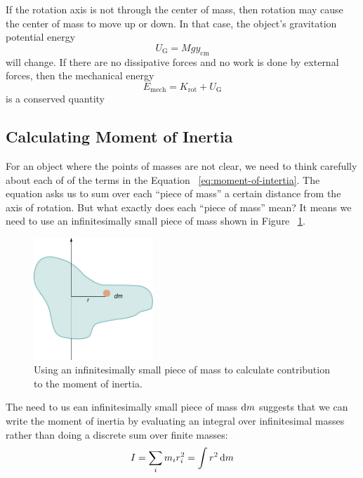 If the rotation axis is not through the center of mass, then rotation
may cause the center of mass to move up or down.  In that case, the
object's gravitation potential energy
\begin{equation}
    U_\mathrm{G} = Mgy_\mathrm{cm}
\end{equation}
will change.  If there are no dissipative forces and no work is done by
external forces, then the mechanical energy
\begin{equation}
    E_\mathrm{mech} = K_\mathrm{rot} + U_\mathrm{G}
\end{equation}
is a conserved quantity

\subsection{Calculating Moment of Inertia}

For an object where the points of masses are not clear, we need to think
carefully about each of of the terms in the Equation~%
\ref{eq:moment-of-intertia}.  The equation asks us to sum over each
``piece of mass'' a certain distance from the axis of rotation.  But
what exactly does each ``piece of mass'' mean?  It means we need to use
an infinitesimally small piece of mass shown in Figure~%
\ref{fig:infinitesimally-small-piece-of-mass}.

\begin{figure}
    \centering
    \includegraphics[width=0.4\textwidth]{../figures/infinitesimally-small-piece-of-mass.jpg}
    \caption{Using an infinitesimally small piece of mass to calculate
    contribution to the moment of inertia.}%
    \label{fig:infinitesimally-small-piece-of-mass}
\end{figure}

The need to us ean infinitesimally small piece of mass
$
    \dif m
$ suggests that we can write the moment of inertia by evaluating an
integral over infinitesimal masses rather than doing a discrete sum over
finite masses:
\begin{equation}
    I = \sum_i m_ir_i^2 = \int r^2 \dif m
\end{equation}

